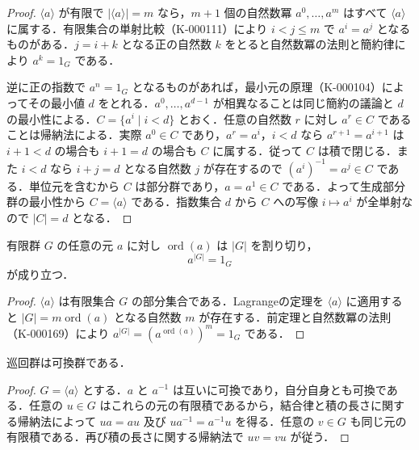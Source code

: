 \begin{proof}
$\langle a\rangle$ が有限で $|\langle a\rangle|=m$ なら，$m+1$ 個の自然数冪 $a^0,\ldots,a^m$ はすべて $\langle a\rangle$ に属する．有限集合の単射比較（K-000111）により $i<j\leq m$ で $a^i=a^j$ となるものがある．$j=i+k$ となる正の自然数 $k$ をとると自然数冪の法則と簡約律により $a^k=1_G$ である．

逆に正の指数で $a^n=1_G$ となるものがあれば，最小元の原理（K-000104）によってその最小値 $d$ をとれる．$a^0,\ldots,a^{d-1}$ が相異なることは同じ簡約の議論と $d$ の最小性による．$C=\{a^i\mid i<d\}$ とおく．任意の自然数 $r$ に対し $a^r\in C$ であることは帰納法による．実際 $a^0\in C$ であり，$a^r=a^i$，$i<d$ なら $a^{r+1}=a^{i+1}$ は $i+1<d$ の場合も $i+1=d$ の場合も $C$ に属する．従って $C$ は積で閉じる．また $i<d$ なら $i+j=d$ となる自然数 $j$ が存在するので $(a^i)^{-1}=a^j\in C$ である．単位元を含むから $C$ は部分群であり，$a=a^1\in C$ である．よって生成部分群の最小性から $C=\langle a\rangle$ である．指数集合 $d$ から $C$ への写像 $i\mapsto a^i$ が全単射なので $|C|=d$ となる．
\end{proof}
\begin{prop}[有限群における元の位数]
有限群 $G$ の任意の元 $a$ に対し $\operatorname{ord}(a)$ は $|G|$ を割り切り，
\[
a^{|G|}=1_G
\]
が成り立つ．
\end{prop}
\begin{proof}
$\langle a\rangle$ は有限集合 $G$ の部分集合である．Lagrangeの定理を $\langle a\rangle$ に適用すると $|G|=m\operatorname{ord}(a)$ となる自然数 $m$ が存在する．前定理と自然数冪の法則（K-000169）により $a^{|G|}=(a^{\operatorname{ord}(a)})^m=1_G$ である．
\end{proof}
\begin{prop}[巡回群の可換性]
巡回群は可換群である．
\end{prop}
\begin{proof}
$G=\langle a\rangle$ とする．$a$ と $a^{-1}$ は互いに可換であり，自分自身とも可換である．任意の $u\in G$ はこれらの元の有限積であるから，結合律と積の長さに関する帰納法によって $ua=au$ 及び $ua^{-1}=a^{-1}u$ を得る．任意の $v\in G$ も同じ元の有限積である．再び積の長さに関する帰納法で $uv=vu$ が従う．
\end{proof}
